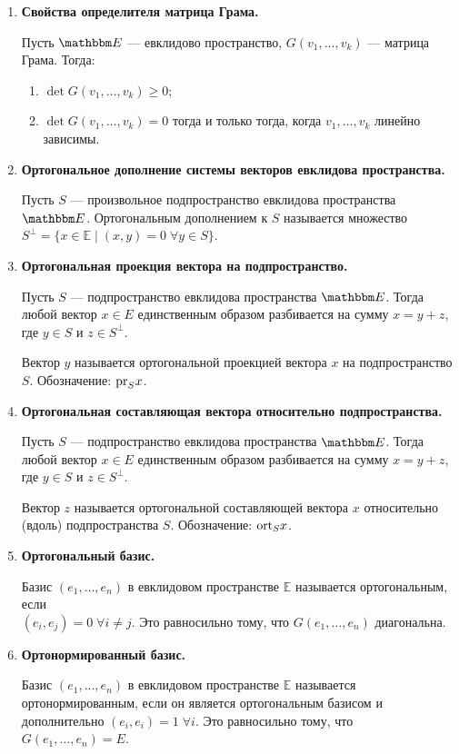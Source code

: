 \begin{enumerate}
\item \textbf{Свойства определителя матрица Грама.}

Пусть $\E$ --- евклидово пространство, $G(v_1,\ldots, v_k)$ --- матрица Грама. Тогда:
\begin{enumerate}
	\item $\det G(v_1, \ldots, v_k) \geqslant 0$;
	\item $\det G(v_1, \ldots, v_k) = 0$ тогда и только тогда, когда $v_1, \ldots, v_k$ линейно зависимы.
\end{enumerate}

\item \textbf{Ортогональное дополнение системы векторов евклидова пространства.}

Пусть $S$ --- произвольное подпространство евклидова пространства $\E$. Ортогональным дополнением к $S$ называется множество $S^{\perp} = \{x\in \mathbb{E}\; |\; (x,y) = 0\;\forall y \in S\}$.

\item \textbf{Ортогональная проекция вектора на подпространство.}

Пусть $S$ --- подпространство евклидова пространства $\E$. Тогда любой вектор $x \in E$ единственным образом разбивается на сумму $x = y + z$, где $y \in S$ и $z \in S^\perp$. 

Вектор $y$ называется ортогональной проекцией вектора $x$ на подпространство $S$. Обозначение: $\mathrm{pr}_S x$. 

\item \textbf{Ортогональная составляющая вектора относительно подпространства.}

Пусть $S$ --- подпространство евклидова пространства $\E$. Тогда любой вектор $x \in E$ единственным образом разбивается на сумму $x = y + z$, где $y \in S$ и $z \in S^\perp$. 

Вектор $z$ называется ортогональной составляющей вектора $x$ относительно (вдоль) подпространства $S$. Обозначение: $\mathrm{ort}_S x$.

\item \textbf{Ортогональный базис.}

Базис $(e_1, \ldots, e_n)$ в евклидовом пространстве $\mathbb{E}$ называется ортогональным, если \\$(e_i, e_j)= 0\; \forall i\neq j$. Это равносильно тому, что $G(e_1, \ldots, e_n)$ диагональна.

\item \textbf{Ортонормированный базис.}

Базис $(e_1, \ldots, e_n)$ в евклидовом пространстве $\mathbb{E}$ называется ортонормированным, если он является ортогональным базисом и дополнительно $(e_i, e_i) = 1\; \forall i$. Это равносильно тому, что $G(e_1, \ldots, e_n) = E$.


\end{enumerate}
